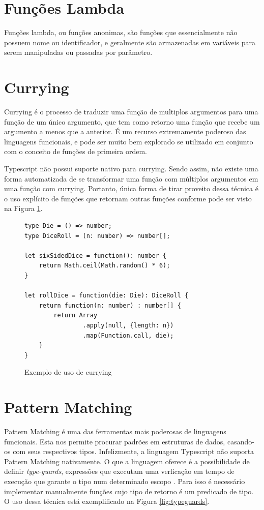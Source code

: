 \documentclass[rel_mlp]{iiufrgs}
\numberwithin{figure}{chapter}
\begin{document}
\section{Funções Lambda}

Funções lambda, ou funções anonimas, são funções que essencialmente não possuem nome ou identificador, e geralmente são armazenadas em variáveis para serem manipuladas ou passadas por parâmetro.


\section{Currying}

Currying é o processo de traduzir uma função de multiplos argumentos para uma função de um único argumento, que tem como retorno uma função que recebe um argumento a menos que a anterior. É um recurso extremamente poderoso das linguagens funcionais, e pode ser muito bem explorado se utilizado em conjunto com o conceito de funções de primeira ordem.

Typescript não possui suporte nativo para currying. Sendo assim, não existe uma forma automatizada de se transformar uma função com múltiplos argumentos em uma função com currying. Portanto, única forma de tirar proveito dessa técnica é o uso explícito de funções que retornam outras funções conforme pode ser visto na Figura \ref{fig:currying}.

\begin{figure}[h]
\begin{verbatim}
type Die = () => number;
type DiceRoll = (n: number) => number[];

let sixSidedDice = function(): number {
    return Math.ceil(Math.random() * 6);
}

let rollDice = function(die: Die): DiceRoll {
    return function(n: number) : number[] {
        return Array
        		.apply(null, {length: n})
        		.map(Function.call, die);
    }
}
\end{verbatim}
\caption{Exemplo de uso de currying}
\label{fig:currying}
\end{figure}

\section{Pattern Matching}

Pattern Matching é uma das ferramentas mais poderosas de linguagens funcionais. Esta nos permite procurar padrões em estruturas de dados, casando-os com seus respectivos tipos. Infelizmente, a linguagem Typescript não suporta Pattern Matching nativamente. O que a linguagem oferece é a possibilidade de definir \textit{type-guards}, expressões que executam uma verficação em tempo de execução que garante o tipo num determinado escopo \cite{advancedtypes}. Para isso é necessário implementar manualmente funções cujo tipo de retorno é um predicado de tipo. O uso dessa técnica está exemplificado na Figura \ref{fig:typeguards}.
\end{document}
